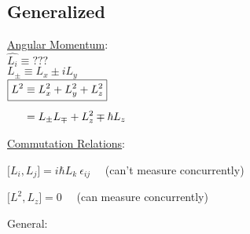 \documentclass[12pt]{article}
\begin{document}
\newpage \noindent
\subsection{Generalized}
\noindent
\begin{minipage}[t]{.35\textwidth}
    \underline{Angular Momentum}:\\[10pt]
    \( \widehat{L_i} \equiv \text{???} \)\\[5pt]
    \( \boxed{ L_\pm \equiv L_x \pm i L_y } \)\\[5pt]
    \( \begin{aligned}
        \Aboxed{ L^2 &\equiv L_x^2 + L_y^2 + L_z^2 } \\[5pt]   
        &= L_\pm L_\mp + L_z^2 \mp \hbar L_z
    \end{aligned} \)
\end{minipage}
\begin{minipage}[t]{.65\textwidth}
    \underline{Commutation Relations}:

    \vspace{10pt} \noindent \(
        \boxed{ \big[ L_i , L_j \big] = i \hbar L_k \ \epsilon_{ij} }
    \) \ \ {\scriptsize (can't measure concurrently)}

    \vspace{10pt} \noindent \(
        \boxed{ \big[ L^2 , L_z \big] = 0}
    \) \ \ {\scriptsize (can measure concurrently)}
\end{minipage}

\vspace{10pt} \noindent
General: \ 
\end{document}
